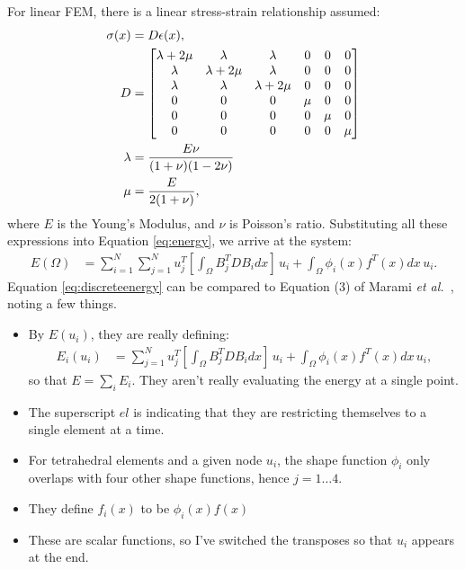 \documentclass[10pt]{article}
\begin{document}
For linear FEM, there is a linear stress-strain relationship assumed:
\begin{align}
  \sigma(x) & = D\epsilon(x),\\
  D & = \begin{bmatrix}
	  \lambda +2\mu & \lambda & \lambda  & 0 & 0 & 0\\
	  \lambda &  \lambda +2\mu & \lambda & 0 & 0 & 0\\
	  \lambda & \lambda & \lambda +2\mu & 0 & 0 & 0\\
	  0 & 0 & 0 & \mu & 0 & 0\\
	  0 & 0 & 0 & 0 & \mu & 0\\
	  0 & 0 & 0 & 0 & 0 & \mu
        \end{bmatrix}\\
  \lambda & = \dfrac{E\nu}{(1+\nu)(1-2\nu)} \notag\\
  \mu & = \dfrac{E}{2(1+\nu)}, \notag
\end{align}
where $E$ is the Young's Modulus, and $\nu$ is Poisson's ratio.  Substituting
all these expressions into Equation \eqref{eq:energy}, we arrive at the system:
\begin{align}
   E(\Omega) & = \sum_{i=1}^N\sum_{j=1}^N u_j^T \left[\int_\Omega B_j^TDB_i dx\right]\, u_i + \int_\Omega \phi_i(x)f^T(x) dx\,u_i. \label{eq:discreteenergy}
\end{align}
Equation \eqref{eq:discreteenergy} can be compared to Equation (3) of Marami \textit{et al.}~\cite{marami:2011:femreg}, noting a few things.
\begin{itemize}
  \item By $E(u_i)$, they are really defining:
  \begin{align}
    E_i(u_i) & = \sum_{j=1}^N u_j^T \left[\int_\Omega B_j^TDB_i dx\right]\, u_i + \int_\Omega \phi_i(x)f^T(x) dx\,u_i,
  \end{align}
  so that $E=\sum_i E_i$. They aren't really evaluating the energy at a single point.  
  \item  The superscript $el$ is indicating that they are restricting themselves to a single element at a time.
  \item For tetrahedral elements and a given node $u_i$, the shape function $\phi_i$ only overlaps with
  four other shape functions, hence $j=1\ldots4$.
  \item They define $f_i(x)$ to be $\phi_i(x)f(x)$
  \item These are scalar functions, so I've switched the transposes so that $u_i$ appears at the end.
\end{itemize}
\end{document}
